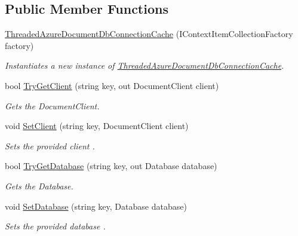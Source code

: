 \subsection*{Public Member Functions}
\begin{DoxyCompactItemize}
\item 
\hyperlink{classCqrs_1_1Azure_1_1DocumentDb_1_1ThreadedAzureDocumentDbConnectionCache_a665571c992cc75f8acc156af72285020_a665571c992cc75f8acc156af72285020}{Threaded\+Azure\+Document\+Db\+Connection\+Cache} (I\+Context\+Item\+Collection\+Factory factory)
\begin{DoxyCompactList}\small\item\em Instantiates a new instance of \hyperlink{classCqrs_1_1Azure_1_1DocumentDb_1_1ThreadedAzureDocumentDbConnectionCache}{Threaded\+Azure\+Document\+Db\+Connection\+Cache}. \end{DoxyCompactList}\item 
bool \hyperlink{classCqrs_1_1Azure_1_1DocumentDb_1_1ThreadedAzureDocumentDbConnectionCache_a0cf4a79ec6bcc1021182f95ddc27edea_a0cf4a79ec6bcc1021182f95ddc27edea}{Try\+Get\+Client} (string key, out Document\+Client client)
\begin{DoxyCompactList}\small\item\em Gets the Document\+Client. \end{DoxyCompactList}\item 
void \hyperlink{classCqrs_1_1Azure_1_1DocumentDb_1_1ThreadedAzureDocumentDbConnectionCache_a4fbbe06abc4c5664243b7be029a4031f_a4fbbe06abc4c5664243b7be029a4031f}{Set\+Client} (string key, Document\+Client client)
\begin{DoxyCompactList}\small\item\em Sets the provided {\itshape client} . \end{DoxyCompactList}\item 
bool \hyperlink{classCqrs_1_1Azure_1_1DocumentDb_1_1ThreadedAzureDocumentDbConnectionCache_a00ea55a85c74b84cfc5f2007e3bc9be3_a00ea55a85c74b84cfc5f2007e3bc9be3}{Try\+Get\+Database} (string key, out Database database)
\begin{DoxyCompactList}\small\item\em Gets the Database. \end{DoxyCompactList}\item 
void \hyperlink{classCqrs_1_1Azure_1_1DocumentDb_1_1ThreadedAzureDocumentDbConnectionCache_ab3c996b8e717aec1e4fc2a70fea52d53_ab3c996b8e717aec1e4fc2a70fea52d53}{Set\+Database} (string key, Database database)
\begin{DoxyCompactList}\small\item\em Sets the provided {\itshape database} . \end{DoxyCompactList}\item 

\end{DoxyCompactItemize}
